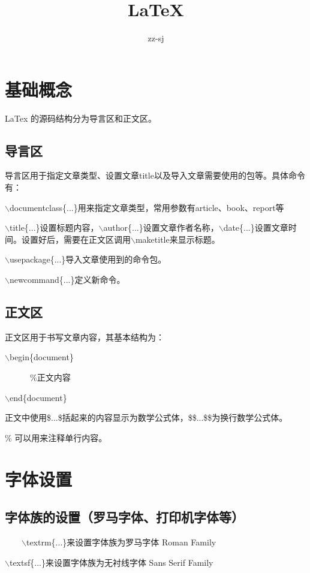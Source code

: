 \documentclass{article}
\title{\LaTeX}
\author{zz-sj}
\begin{document}
\maketitle
\begin{CJK}{UTF8}{gbsn}

\section{基础概念}
LaTex 的源码结构分为导言区和正文区。

\subsection{导言区}
导言区用于指定文章类型、设置文章title以及导入文章需要使用的包等。具体命令有：

$\backslash$documentclass\{...\}用来指定文章类型，常用参数有article、book、report等

$\backslash$title\{...\}设置标题内容，$\backslash$author\{...\}设置文章作者名称，$\backslash$date\{...\}设置文章时间。设置好后，需要在正文区调用$\backslash$maketitle来显示标题。

$\backslash$usepackage\{...\}导入文章使用到的命令包。

$\backslash$newcommand\{...\}定义新命令。

\subsection{正文区}
正文区用于书写文章内容，其基本结构为：

$\backslash$begin\{document\}

	\ \ \ \ \ \  \%正文内容

$\backslash$end\{document\}

正文中使用\$...\$括起来的内容显示为数学公式体，\$\$...\$\$为换行数学公式体。

\% 可以用来注释单行内容。

\section{字体设置}
\subsection{字体族的设置（罗马字体、打印机字体等）}
\ \ \ \  $\backslash$textrm\{...\}来设置字体族为罗马字体 \textrm{Roman Family}

$\backslash$textsf\{...\}来设置字体族为无衬线字体 \textsf{Sans Serif Family}


\end{CJK}
\end{document}
